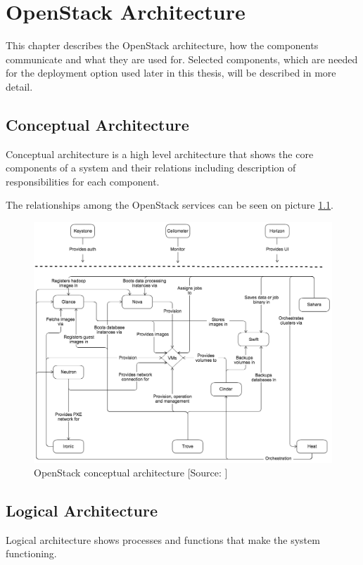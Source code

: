 \chapter{OpenStack Architecture}
\label{ch:arch}
This chapter describes the OpenStack architecture, how the components communicate and what they are used for. Selected components, which are needed for the deployment option used later in this thesis, will be described in more detail.

\section{Conceptual Architecture}
Conceptual architecture is a high level architecture that shows the core components of a system and their relations including description of responsibilities for each component.

The relationships among the OpenStack services can be seen on picture \ref{fig:OpenStack_conceptual_arch}.
\begin{figure}[!h]
  \includegraphics[width=\textwidth]{fig/OpenStack_conceptual_arch.png}
  \caption{OpenStack conceptual architecture [Source: \cite{conceptualArch}]}
  \label{fig:OpenStack_conceptual_arch}
\end{figure}





\section{Logical Architecture}
Logical architecture shows processes and functions that make the system functioning.

